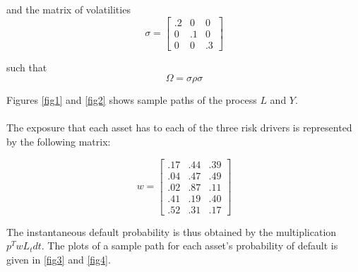 \documentclass[12pt]{article}
\theoremstyle{definition}
\begin{document}
and the matrix of volatilities
\begin{equation}{\sigma}=
\left[\begin{array}{ccc} .2 & 0 & 0\\ 0 & .1 & 0 \\0 & 0 & .3 \end{array}\right]
\end{equation}

such that 
\[{\Omega}={\sigma}{\rho} {\sigma}\]

Figures \ref{fig1} and \ref{fig2} shows sample paths of the process \({L}\) and \({Y}\).
\\
\\
The exposure that each asset has to each of the three risk drivers is represented by the following matrix:

\begin{equation}
{w}=\left[ \begin{array}{ccc}
 .17 & .44 & .39 \\
.04 & .47 & .49 \\
.02 & .87 & .11 \\
.41 & .19 & .40 \\
.52 & .31 &.17 
\end{array}\right]
\end{equation}

The instantaneous default probability is thus obtained by the multiplication \({p} ^T {w}{L}_t dt \).  The plots of a sample path for each asset's probability of default is given in \ref{fig3} and \ref{fig4}.  
\end{document}
